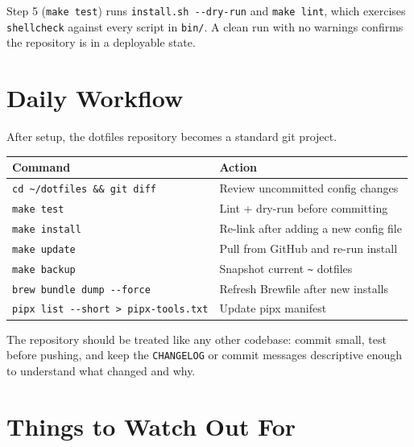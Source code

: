 \documentclass[
  11pt,
  letterpaper,
  DIV=11,
  numbers=noendperiod]{scrartcl}
\newcounter{none} %
\begin{document}
Step 5 (\texttt{make\ test}) runs \texttt{install.sh\ -\/-dry-run} and
\texttt{make\ lint}, which exercises \texttt{shellcheck} against every
script in \texttt{bin/}. A clean run with no warnings confirms the
repository is in a deployable state.

\section{Daily Workflow}\label{daily-workflow}

After setup, the dotfiles repository becomes a standard git project.

{\def\LTcaptype{none} %
\begin{longtable}[]{@{}
  >{\raggedright\arraybackslash}p{}
  >{\raggedright\arraybackslash}p{}@{}}
\toprule\noalign{}
\begin{minipage}[b]{\linewidth}\raggedright
Command
\end{minipage} & \begin{minipage}[b]{\linewidth}\raggedright
Action
\end{minipage} \\
\midrule\noalign{}
\endhead
\bottomrule\noalign{}
\endlastfoot
\texttt{cd\ \textasciitilde{}/dotfiles\ \&\&\ git\ diff} & Review
uncommitted config changes \\
\texttt{make\ test} & Lint + dry-run before committing \\
\texttt{make\ install} & Re-link after adding a new config file \\
\texttt{make\ update} & Pull from GitHub and re-run install \\
\texttt{make\ backup} & Snapshot current \texttt{\textasciitilde{}}
dotfiles \\
\texttt{brew\ bundle\ dump\ -\/-force} & Refresh Brewfile after new
installs \\
\texttt{pipx\ list\ -\/-short\ \textgreater{}\ pipx-tools.txt} & Update
pipx manifest \\
\end{longtable}
}

The repository should be treated like any other codebase: commit small,
test before pushing, and keep the \texttt{CHANGELOG} or commit messages
descriptive enough to understand what changed and why.

\section{Things to Watch Out For}\label{things-to-watch-out-for}
\end{document}
